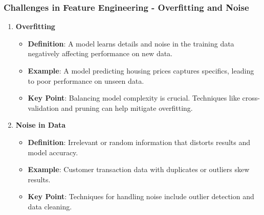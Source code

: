 \documentclass[aspectratio=169]{beamer}
\begin{document}
\begin{frame}[fragile]
    \frametitle{Challenges in Feature Engineering - Overfitting and Noise}
    
    \begin{enumerate}
        \item \textbf{Overfitting}
            \begin{itemize}
                \item \textbf{Definition}: A model learns details and noise in the training data negatively affecting performance on new data.
                \item \textbf{Example}: A model predicting housing prices captures specifics, leading to poor performance on unseen data.
                \item \textbf{Key Point}: Balancing model complexity is crucial. Techniques like cross-validation and pruning can help mitigate overfitting.
            \end{itemize}
        
        \item \textbf{Noise in Data}
            \begin{itemize}
                \item \textbf{Definition}: Irrelevant or random information that distorts results and model accuracy.
                \item \textbf{Example}: Customer transaction data with duplicates or outliers skew results.
                \item \textbf{Key Point}: Techniques for handling noise include outlier detection and data cleaning.
            \end{itemize}
    \end{enumerate}
\end{frame}
\end{document}

